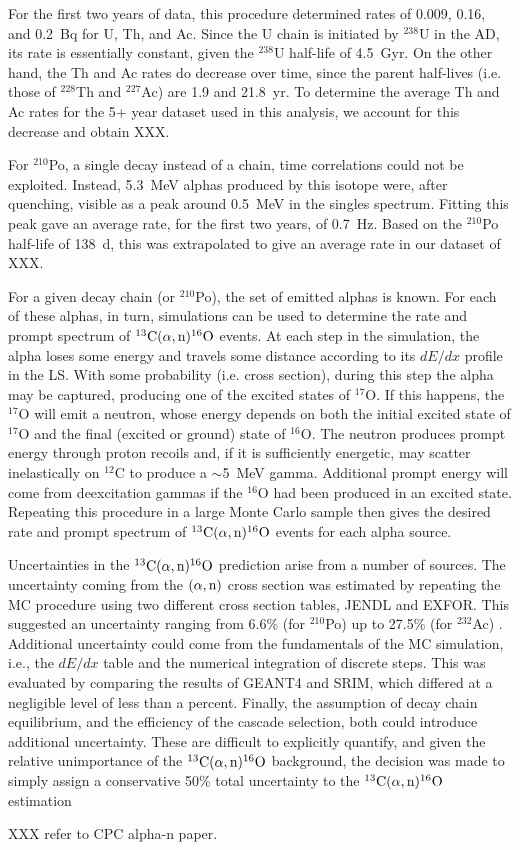 \documentclass[../thesis.tex]{subfiles}
\begin{document}
For the first two years of data, this procedure determined rates of 0.009, 0.16,
and 0.2~Bq for U, Th, and Ac. Since the U chain is initiated by $^{238}$U in the
AD, its rate is essentially constant, given the $^{238}$U half-life of
4.5~Gyr. On the other hand, the Th and Ac rates do decrease over time, since the
parent half-lives (i.e. those of $^{228}$Th and $^{227}$Ac) are 1.9 and
21.8~yr. To determine the average Th and Ac rates for the 5+ year dataset used
in this analysis, we account for this decrease and obtain XXX.

For $^{210}$Po, a single decay instead of a chain, time correlations could not
be exploited. Instead, 5.3~MeV alphas produced by this isotope were, after
quenching, visible as a peak around 0.5~MeV in the singles spectrum. Fitting
this peak gave an average rate, for the first two years, of 0.7~Hz. Based on the
$^{210}$Po half-life of 138~d, this was extrapolated to give an average rate in
our dataset of XXX.

For a given decay chain (or $^{210}$Po), the set of emitted alphas is known. For
each of these alphas, in turn, simulations can be used to determine the rate and
prompt spectrum of $^{13}\mathrm{C}(\alpha, \mathrm{n})^{16}\mathrm{O}$ events. At each step in the simulation, the alpha
loses some energy and travels some distance according to its $dE/dx$ profile in
the LS. With some probability (i.e. cross section), during this step the alpha
may be captured, producing one of the excited states of $^{17}$O. If this
happens, the $^{17}$O will emit a neutron, whose energy depends on both the
initial excited state of $^{17}$O and the final (excited or ground) state of
$^{16}$O. The neutron produces prompt energy through proton recoils and, if it
is sufficiently energetic, may scatter inelastically on $^{12}$C to produce a
$\sim$5~MeV gamma. Additional prompt energy will come from deexcitation gammas
if the $^{16}$O had been produced in an excited state. Repeating this procedure
in a large Monte Carlo sample then gives the desired rate and prompt spectrum of
$^{13}\mathrm{C}(\alpha, \mathrm{n})^{16}\mathrm{O}$ events for each alpha source.

Uncertainties in the $^{13}\mathrm{C}(\alpha, \mathrm{n})^{16}\mathrm{O}$ prediction arise from a number of sources. The
uncertainty coming from the $(\alpha,\mathrm{n})$ cross section was estimated by repeating
the MC procedure using two different cross section tables, JENDL and EXFOR. This
suggested an uncertainty ranging from 6.6\% (for $^{210}$Po) up to 27.5\% (for
$^{232}$Ac) \cite{Zhao_2014}. Additional uncertainty could come from the
fundamentals of the MC simulation, i.e., the $dE/dx$ table and the numerical
integration of discrete steps. This was evaluated by comparing the results of
GEANT4 and SRIM, which differed at a negligible level of less than a
percent. Finally, the assumption of decay chain equilibrium, and the efficiency
of the cascade selection, both could introduce additional uncertainty. These are
difficult to explicitly quantify, and given the relative unimportance of the
$^{13}\mathrm{C}(\alpha, \mathrm{n})^{16}\mathrm{O}$ background, the decision was made to simply assign a conservative 50\%
total uncertainty to the $^{13}\mathrm{C}(\alpha, \mathrm{n})^{16}\mathrm{O}$ estimation

XXX refer to CPC alpha-n paper.
\end{document}
